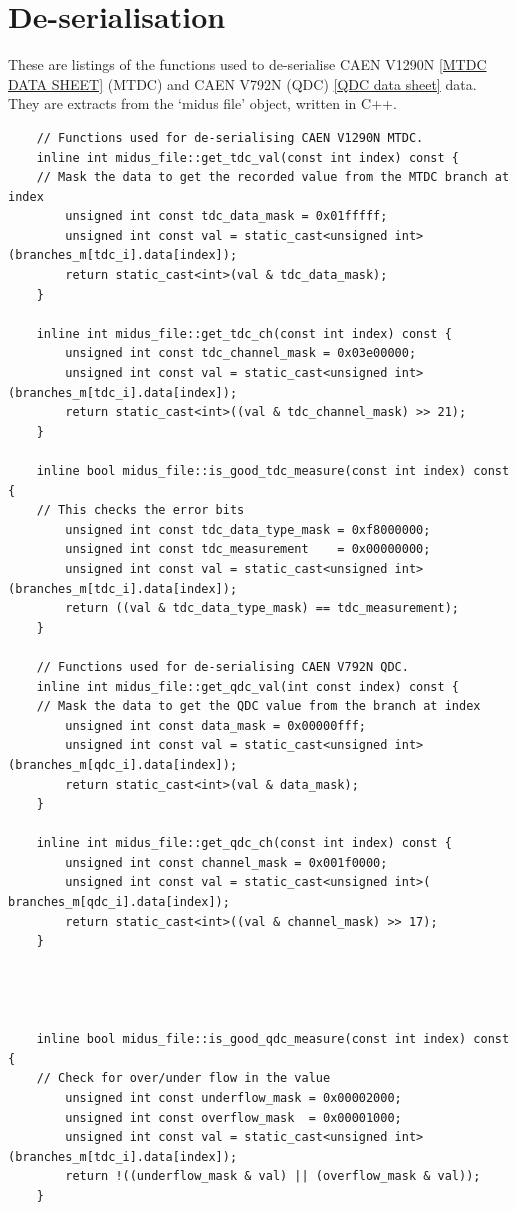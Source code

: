 \documentclass[]{article}
\begin{document}
\appendix
\section{De-serialisation} %
\label{app:deserialisation}
%
These are listings of the functions used to de-serialise CAEN V1290N \ref{MTDC DATA SHEET} (MTDC) and CAEN V792N (QDC) \ref{QDC data sheet} data. They are extracts from the `midus file' object, written in C++.
%
\begin{verbatim}
    // Functions used for de-serialising CAEN V1290N MTDC.
    inline int midus_file::get_tdc_val(const int index) const {
    // Mask the data to get the recorded value from the MTDC branch at index
        unsigned int const tdc_data_mask = 0x01fffff;
        unsigned int const val = static_cast<unsigned int>(branches_m[tdc_i].data[index]);
        return static_cast<int>(val & tdc_data_mask);
    }
    
    inline int midus_file::get_tdc_ch(const int index) const {
        unsigned int const tdc_channel_mask = 0x03e00000;
        unsigned int const val = static_cast<unsigned int>(branches_m[tdc_i].data[index]);
        return static_cast<int>((val & tdc_channel_mask) >> 21);
    }
    
    inline bool midus_file::is_good_tdc_measure(const int index) const {
    // This checks the error bits
        unsigned int const tdc_data_type_mask = 0xf8000000;
        unsigned int const tdc_measurement    = 0x00000000;
        unsigned int const val = static_cast<unsigned int>(branches_m[tdc_i].data[index]);
        return ((val & tdc_data_type_mask) == tdc_measurement);
    }
    
    // Functions used for de-serialising CAEN V792N QDC.
    inline int midus_file::get_qdc_val(int const index) const {
    // Mask the data to get the QDC value from the branch at index
        unsigned int const data_mask = 0x00000fff;
        unsigned int const val = static_cast<unsigned int>(branches_m[qdc_i].data[index]);
        return static_cast<int>(val & data_mask); 
    }
    
    inline int midus_file::get_qdc_ch(const int index) const {
        unsigned int const channel_mask = 0x001f0000;
        unsigned int const val = static_cast<unsigned int>( branches_m[qdc_i].data[index]);
        return static_cast<int>((val & channel_mask) >> 17);
    }
    
    
    
    
    inline bool midus_file::is_good_qdc_measure(const int index) const {
    // Check for over/under flow in the value
        unsigned int const underflow_mask = 0x00002000;
        unsigned int const overflow_mask  = 0x00001000;
        unsigned int const val = static_cast<unsigned int>(branches_m[tdc_i].data[index]);
        return !((underflow_mask & val) || (overflow_mask & val));
    }
\end{verbatim}
\end{document}
